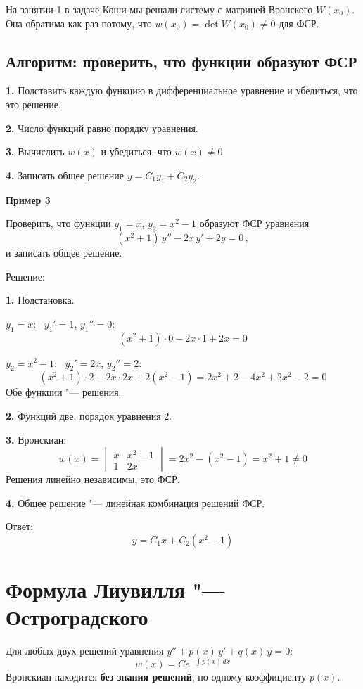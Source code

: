 \documentclass[11pt,a4paper]{article}
\newcommand{\example}[1]{\par\medskip\noindent\textbf{#1}\par\nopagebreak\smallskip}
\begin{document}
На занятии 1 в задаче Коши мы решали систему с матрицей Вронского $W(x_0)$. Она обратима как раз потому, что $w(x_0)=\det W(x_0) \ne 0$ для ФСР.

\subsection*{Алгоритм: проверить, что функции образуют ФСР}

\textbf{1.} Подставить каждую функцию в дифференциальное уравнение и убедиться, что это решение.

\textbf{2.} Число функций равно порядку уравнения.

\textbf{3.} Вычислить $w(x)$ и убедиться, что $w(x) \ne 0$.

\textbf{4.} Записать общее решение $y = C_1 y_1 + C_2 y_2$.

\example{Пример 3}

Проверить, что функции $y_1 = x$, $y_2 = x^2 - 1$ образуют ФСР уравнения
\[
  (x^2 + 1)\, y'' - 2x\, y' + 2y = 0\,,
\]
и записать общее решение.

Решение:

\textbf{1.} Подстановка.

$y_1 = x$: \ $y_1' = 1$, $y_1'' = 0$:
\[
  (x^2 + 1) \cdot 0 - 2x \cdot 1 + 2x = 0
\]

$y_2 = x^2 - 1$: \ $y_2' = 2x$, $y_2'' = 2$:
\[
  (x^2 + 1) \cdot 2 - 2x \cdot 2x + 2(x^2 - 1) = 2x^2 + 2 - 4x^2 + 2x^2 - 2 = 0
\]
Обе функции "--- решения.

\textbf{2.} Функций две, порядок уравнения 2.

\textbf{3.} Вронскиан:
\[
  w(x) =
  \begin{vmatrix} x & x^2 - 1 \\ 1 & 2x \end{vmatrix}
  = 2x^2 - (x^2 - 1) = x^2 + 1 \ne 0
\]
Решения линейно независимы, это ФСР.

\textbf{4.} Общее решение "--- линейная комбинация решений ФСР.

Ответ:
\[
  y = C_1 x + C_2 (x^2 - 1)
\]

\section*{Формула Лиувилля "--- Остроградского}


Для любых двух решений уравнения $y'' + p(x)\, y' + q(x)\, y = 0$:
\[
  w(x) = C e^{-\int p(x)\,dx}
\]
Вронскиан находится \textbf{без знания решений}, по одному коэффициенту $p(x)$.
\end{document}
